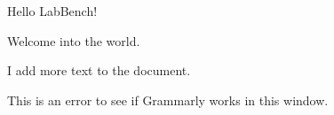\documentclass{article}
\begin{document}
Hello LabBench!

Welcome into the world.

I add more text to the document.

This is an error to see if Grammarly works in this window.
\end{document}
